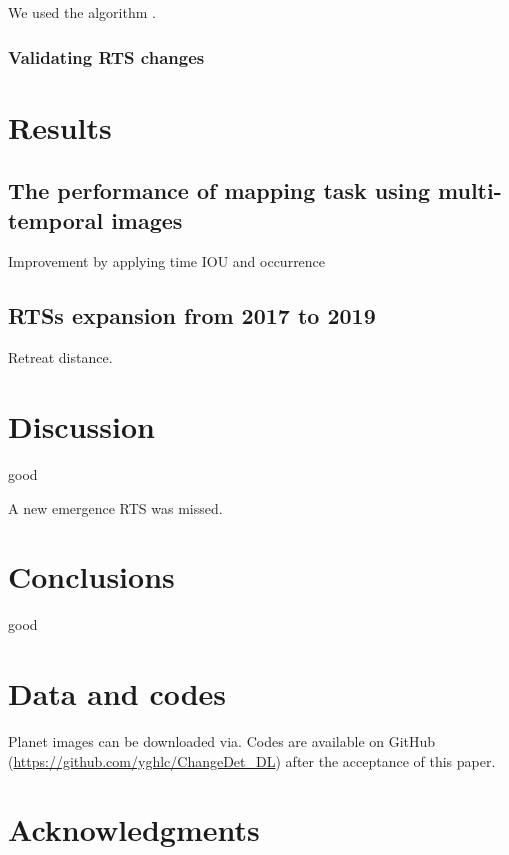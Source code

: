 \documentclass[authoryear,preprint,review,12pt]{elsarticle}
\begin{document}
We used the algorithm \citep{zhu2014computing}.

\subsubsection{Validating RTS changes}
\label{sec_validation_change}



\section{Results}
\label{sec_result}

\subsection{The performance of mapping task using multi-temporal images}
\label{sec_mapping_performance}

Improvement by applying time IOU and occurrence


\subsection{RTSs expansion from 2017 to 2019}
\label{sec_rst_expanding}

Retreat distance. 


\section{Discussion}
\label{sec_discussion}

good

A new emergence RTS was missed. 

\section{Conclusions}
\label{sec_conclusion}

 good

\section{Data and codes}
\label{sec_data_codes}

Planet images can be downloaded via. 
Codes are available on GitHub (\url{https://github.com/yghlc/ChangeDet_DL}) after the acceptance of this paper.

\section{Acknowledgments}
\label{sec_acknowledgments}
\end{document}
